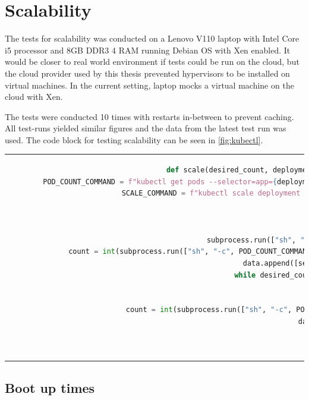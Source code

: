 \section{Scalability}
The tests for scalability was conducted on a Lenovo V110 laptop with Intel Core i5 processor and 8GB DDR3 4 RAM running Debian OS with Xen enabled. It would be closer to real world environment if tests could be run on the cloud, but the cloud provider used by this thesis prevented hypervisors to be installed on virtual machines. In the current setting, laptop mocks a virtual machine on the cloud with Xen.

The tests were conducted 10 times with restarts in-between to prevent caching. All test-runs yielded similar figures and the data from the latest test run was used. The code block for testing scalability can be seen in \ref{fig:kubectl}.

\begin{code}[htpb]
  \centering
  \begin{tabular}{c}
  \begin{lstlisting}[language=Python]
    def scale(desired_count, deployment_name): # usage: result = scale("nginx",20)
        POD_COUNT_COMMAND = f"kubectl get pods --selector=app={deployment_name} | grep 'Running\|Terminating' | wc -l" # get running or terminating pods
        SCALE_COMMAND = f"kubectl scale deployment {deployment_name} --replicas {desired_count}" # scale deployment
        data = []
        second = 0
        INTERVAL = 0.5
        subprocess.run(["sh", "-c", SCALE_COMMAND]) # execute scale command
        count = int(subprocess.run(["sh", "-c", POD_COUNT_COMMAND], stdout = subprocess.PIPE).stdout.decode("utf-8")) # count number of pods
        data.append([second, count]) # save number of pods
        while desired_count != count: # continue while scaling
            time.sleep(INTERVAL)
            second += INTERVAL
            count = int(subprocess.run(["sh", "-c", POD_COUNT_COMMAND], stdout = subprocess.PIPE).stdout.decode("utf-8"))
            data.append([second, count])

        return data

\end{lstlisting}
\end{tabular}
\caption{Testing Scalability}\label{fig:kubectl}
\end{code}
\subsection{Boot up times}


